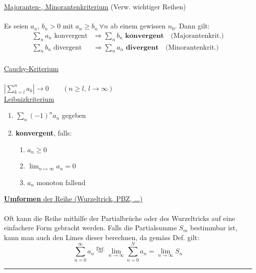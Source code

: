 \documentclass[6pt]{article}
\begin{document}
\begin{multicols*}{3}
	\underline{Majoranten-, Minorantenkriterium} (Verw. wichtiger Reihen) \\
	\vspace{-2mm}\\
	Es seien $a_n$, $b_n > 0$ mit $a_n \geq b_n\ \forall n$ ab einem gewissen $n_0$. Dann gilt: 
	\begin{equation*}
		\begin{split}
			\sum_n a_n \text{ konvergent} & \Rightarrow \sum_n b_n \textbf{ konvergent}\quad \text{(Majorantenkrit.)} \\
			\sum_n b_n \text{ divergent} & \Rightarrow \sum_n a_n \textbf{ divergent}\quad \text{(Minorantenkrit.)} \\
		\end{split}
	\end{equation*}
	
	\underline{Cauchy-Kriterium} \\
	\vspace{-1mm}\\
	$\left| \sum_{k=l}^n a_k \right| \to 0 \qquad (n \geq l, \, l \to \infty)$
	\vspace{0mm}\\
	
	
	\underline{Leibnizkriterium} \\
	\vspace{-5mm}
	\begin{enumerate}
		\item $\sum_n (-1)^n a_n$ gegeben
		\item \textbf{konvergent}, falls:
		\begin{enumerate}
			\item $a_n \geq 0$
			\item $\lim_{n\mapsto\infty} a_n = 0$
			\item $a_n$ monoton fallend
		\end{enumerate}
	\end{enumerate}
	\vspace{3mm}
	
	\underline{{\bf Umformen} der Reihe (Wurzeltrick, PBZ, ...)} \\
	\vspace{-2mm}\\
	Oft kann die Reihe mithilfe der Partialbr{\"u}che oder des Wurzeltricks auf eine einfachere Form gebracht werden. Falls die Partialsumme $S_m$ bestimmbar ist, kann man auch den Limes dieser berechnen, da gem{\"a}ss Def. gilt:
	\begin{equation*}
					\sum_{n=0}^\infty a_n \overset{\text{Def.}}= \lim\limits_{n \to \infty} \sum_{n=0}^N a_n = \lim\limits_{n \to \infty} S_n
	\end{equation*}
	\vspace{2mm}
  		\noindent\textcolor{gray}{\rule{9cm}{0.1pt}}
	\vspace{-8mm}\\
	


\end{multicols*}
\end{document}
